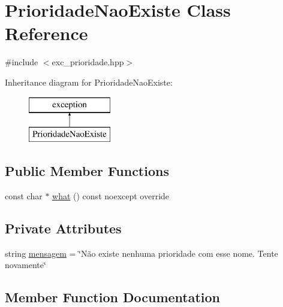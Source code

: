 \hypertarget{classPrioridadeNaoExiste}{}\section{Prioridade\+Nao\+Existe Class Reference}
\label{classPrioridadeNaoExiste}


{\ttfamily \#include $<$exc\+\_\+prioridade.\+hpp$>$}

Inheritance diagram for Prioridade\+Nao\+Existe\+:\begin{figure}[H]
\begin{center}
\leavevmode
\includegraphics[height=2.000000cm]{classPrioridadeNaoExiste}
\end{center}
\end{figure}
\subsection*{Public Member Functions}
\begin{DoxyCompactItemize}
\item 
const char $\ast$ \hyperlink{classPrioridadeNaoExiste_a062cd6dd0326bc61a9505eab4cd78d4f}{what} () const noexcept override
\end{DoxyCompactItemize}
\subsection*{Private Attributes}
\begin{DoxyCompactItemize}
\item 
string \hyperlink{classPrioridadeNaoExiste_a5c675d0cd81b87bb26b6cac15b29cfb2}{mensagem} = \char`\"{}Não existe nenhuma prioridade com esse nome. Tente novamente\char`\"{}
\end{DoxyCompactItemize}


\subsection{Member Function Documentation}
\mbox{\label{classPrioridadeNaoExiste_a062cd6dd0326bc61a9505eab4cd78d4f}} 
